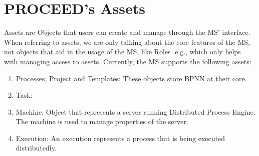 %
%
%
%
%

\section{PROCEED's Assets}
\label{cha:relatedwork:proceed-assets}

Assets are Objects that users can create and manage through the MS' interface.
When referring to assets, we are only talking about the core features of the MS, not
objects that aid in the usage of the MS, like Roles .e.g., which only helps with managing
access to assets.
Currently, the MS supports the following assets:

\begin{enumerate}
	\item Processes, Project and Templates: These objects store BPNN at their core.
	\item Task:
	\item Machine: Object that represents a server running Distributed Process Engine. The
	      machine is used to manage properties of the server.
	\item Execution: An execution represents a process that is being executed distributedly.
\end{enumerate}

